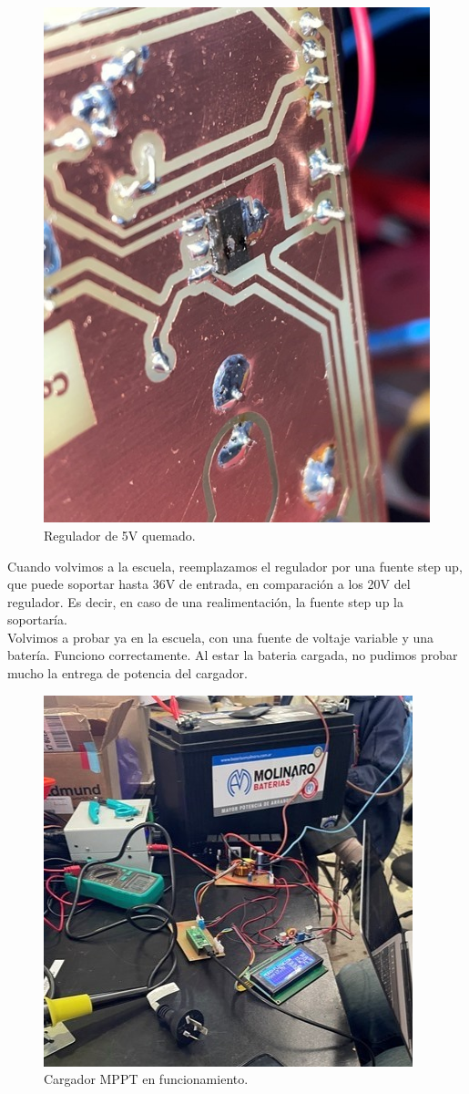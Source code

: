 \begin{figure}[H]
    \centering
    \includegraphics[width=0.75\linewidth]{informes/IMG_8878.jpg}
    \caption{Regulador de 5V quemado.}
\end{figure}

Cuando volvimos a la escuela, reemplazamos el regulador por una fuente step up, que puede soportar hasta 36V de entrada, en comparación a los 20V del regulador. Es decir, en caso de una realimentación, la fuente step up la soportaría.\\ 

Volvimos a probar ya en la escuela, con una fuente de voltaje variable y una batería. Funciono correctamente. Al estar la bateria cargada, no pudimos probar mucho la entrega de potencia del cargador.\\

\begin{figure}[H]
    \centering
    \includegraphics[width=0.75\linewidth]{informes/IMG_8879.jpg}
    \caption{Cargador MPPT en funcionamiento.}
\end{figure}

